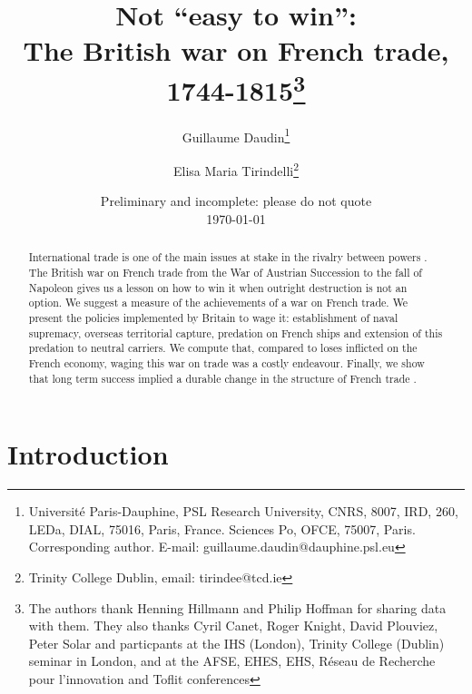 \documentclass[12pt,a4paper,notitlepage,english]{article}
\author{
  Guillaume Daudin\thanks{Université Paris-Dauphine, PSL Research University, CNRS, 8007, IRD, 260, LEDa, DIAL, 75016, Paris, France. Sciences Po, OFCE, 75007, Paris. Corresponding author. E-mail: guillaume.daudin@dauphine.psl.eu}
  \and
  Elisa Maria Tirindelli\thanks{Trinity College Dublin, email: tirindee@tcd.ie}
}
\title{Not “easy to win”: \\ The British war on French trade, 1744-1815\thanks{The authors thank Henning Hillmann and Philip Hoffman for sharing data with them. They also thanks Cyril Canet, Roger Knight, David Plouviez, Peter Solar and particpants at the IHS (London), Trinity College (Dublin) seminar in London, and at the AFSE, EHES, EHS, Réseau de Recherche pour l’innovation and Toflit conferences}}
\date{Preliminary and incomplete: please do not quote \\  \today}
\begin{document}
\maketitle


\begin{abstract}
International trade is one of the main issues at stake in the rivalry between powers . The
British war on French trade from the War of Austrian Succession to the fall of Napoleon gives
us a lesson on how to win it when outright destruction is not an option. We suggest a measure
of the achievements of a war on French trade. We present the policies implemented by Britain
to wage it: establishment of naval supremacy, overseas territorial capture, predation on French
ships and extension of this predation to neutral carriers.
We compute that, compared to loses inflicted on the French economy, waging this war on trade was a costly endeavour.
Finally, we show that long term success implied a durable change in the structure of French trade .
\end{abstract}




\section{Introduction} \label{introduction}


\maketitle

%
\end{document}
